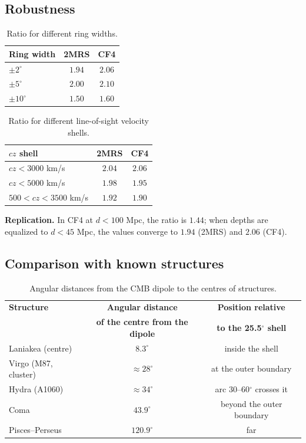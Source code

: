 \documentclass[11pt,a4paper]{article}
\begin{document}
\subsection{Robustness}
\begin{table}[H]
\centering
\caption{Ratio for different ring widths.}
\begin{tabular}{lcc}
\toprule
\textbf{Ring width} & \textbf{2MRS} & \textbf{CF4} \\
\midrule
\(\pm 2^\circ\) & \(1.94\) & \(2.06\) \\
\(\pm 5^\circ\) & \(2.00\) & \(2.10\) \\
\(\pm 10^\circ\) & \(1.50\) & \(1.60\) \\
\bottomrule
\end{tabular}
\end{table}

\begin{table}[H]
\centering
\caption{Ratio for different line-of-sight velocity shells.}
\begin{tabular}{lcc}
\toprule
\textbf{\(cz\) shell} & \textbf{2MRS} & \textbf{CF4} \\
\midrule
\(cz < 3000\) km/s & \(2.04\) & \(2.06\) \\
\(cz < 5000\) km/s & \(1.98\) & \(1.95\) \\
\(500 < cz < 3500\) km/s & \(1.92\) & \(1.90\) \\
\bottomrule
\end{tabular}
\end{table}

\textbf{Replication.} In CF4 at \(d < 100\) Mpc, the ratio is \(1.44\); when depths are equalized to \(d < 45\) Mpc, the values converge to \(1.94\) (2MRS) and \(2.06\) (CF4).

\subsection{Comparison with known structures}
\begin{table}[H]
\centering
\caption{Angular distances from the CMB dipole to the centres of structures.}
\begin{tabular}{lcc}
\toprule
\textbf{Structure} & \textbf{Angular distance} & \textbf{Position relative} \\
 & \textbf{of the centre from the dipole} & \textbf{to the 25.5\(^\circ\) shell} \\
\midrule
Laniakea (centre) & \(8.3^\circ\) & inside the shell \\
Virgo (M87, cluster) & \(\approx 28^\circ\) & at the outer boundary \\
Hydra (A1060) & \(\approx 34^\circ\) & arc 30--60\(^\circ\) crosses it \\
Coma & \(43.9^\circ\) & beyond the outer boundary \\
Pisces--Perseus & \(120.9^\circ\) & far \\
\bottomrule
\end{tabular}
\end{table}
\end{document}
